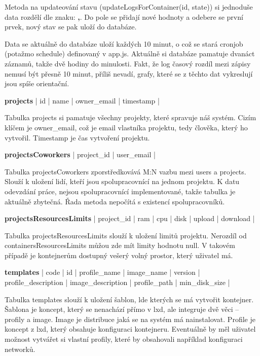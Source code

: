 \documentclass[a4paper,oneside,12pt]{report}
\begin{document}
Metoda na updateování stavu (updateLogsForContainer(id, state)) si jednoduše data rozdělí dle znaku: \textbf{,}.
Do pole se přidají nové hodnoty a odebere se první prvek, nový stav se pak uloží do databáze.

Data se aktuálně do databáze uloží každých 10 minut, o což se stará cronjob (potažmo schedule) definovaný v app.js.
Aktuálně si databáze pamatuje dvanáct záznamů, takže dvě hodiny do minulosti.
Fakt, že log časový rozdíl mezi zápisy nemusí být přesně 10 minut, příliš nevadí, grafy, které se z těchto dat vykreslují jsou spíše orientační.


\vspace{0.3cm}
\noindent
\textbf{projects} | id | name | owner\_email | timestamp |

Tabulka projects si pamatuje všechny projekty, které spravuje náš systém.
Cizím klíčem je owner\_email, což je email vlastníka projektu, tedy člověka, který ho vytvořil.
Timestamp je čas vytvoření projektu.

\vspace{0.3cm}
\noindent
\textbf{projectsCoworkers} | project\_id | user\_email |

Tabulka projectsCoworkers zporstředkovává M:N vazbu mezi users a projects.
Slouží k uložení lidí, kteří jsou spolupracovnící na jednom projektu.
K datu odevzdání práce, nejsou spolupracovnící implementované, takže tabulka je aktuálně zbytečná.
Řada metoda nepočítá s existencí spolupracovníků.

\vspace{0.3cm}
\noindent
\textbf{projectsResourcesLimits} | project\_id | ram | cpu | disk | upload | download |

Tabulka projectsResourcesLimits slouží k uložení limitů projektu.
Nerozdíl od containersResourcesLimits můžou zde mít limity hodnotu null.
V takovém případě je kontejnerům dostupný vešerý volný prostor, který uživatel má.

\vspace{0.3cm}
\noindent
\textbf{templates} | code | id | profile\_name | image\_name | version | profile\_description | image\_description | profile\_path | min\_disk\_size |

Tabulka templates slouží k uložení šablon, lde kterých se má vytvořit kontejner.
Šablona je koncept, který se nenachází přímo v lxd, ale integruje dvě věci -- profily a image.
Image je distribuce jaká se na systém má nainstalovat.
Profile je koncept z lxd, který obsahuje konfiguraci kontejneru.
Eventuálně by měl uživatel možnost vytvářet si vlastní profily, které by obsahovali například konfiguraci networků.
\end{document}
